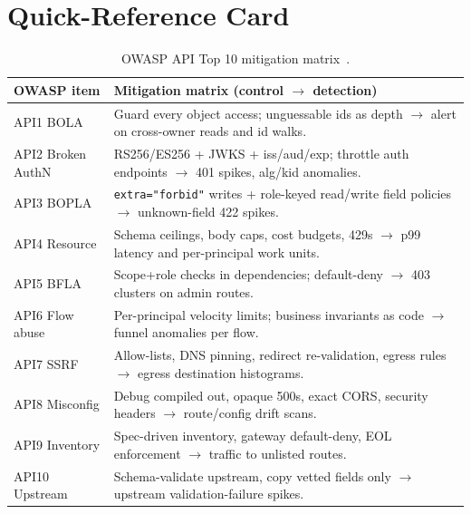 \section{Quick-Reference Card}
\label{sec:ch16-quickref}

\begin{table}[ht]
\centering\small
\begin{tabularx}{\textwidth}{l X}
\toprule
\textbf{OWASP item} & \textbf{Mitigation matrix (control $\to$ detection)} \\
\midrule
API1 BOLA & Guard every object access; unguessable ids as depth $\to$ alert on cross-owner reads and id walks. \\
API2 Broken AuthN & RS256/ES256 + JWKS + iss/aud/exp; throttle auth endpoints $\to$ 401 spikes, alg/kid anomalies. \\
API3 BOPLA & \texttt{extra="forbid"} writes + role-keyed read/write field policies $\to$ unknown-field 422 spikes. \\
API4 Resource & Schema ceilings, body caps, cost budgets, 429s $\to$ p99 latency and per-principal work units. \\
API5 BFLA & Scope+role checks in dependencies; default-deny $\to$ 403 clusters on admin routes. \\
API6 Flow abuse & Per-principal velocity limits; business invariants as code $\to$ funnel anomalies per flow. \\
API7 SSRF & Allow-lists, DNS pinning, redirect re-validation, egress rules $\to$ egress destination histograms. \\
API8 Misconfig & Debug compiled out, opaque 500s, exact CORS, security headers $\to$ route/config drift scans. \\
API9 Inventory & Spec-driven inventory, gateway default-deny, EOL enforcement $\to$ traffic to unlisted routes. \\
API10 Upstream & Schema-validate upstream, copy vetted fields only $\to$ upstream validation-failure spikes. \\
\bottomrule
\end{tabularx}
\caption{OWASP API Top 10 mitigation matrix~\cite{owaspapisecurity}.}
\label{tab:ch16-matrix}
\end{table}

